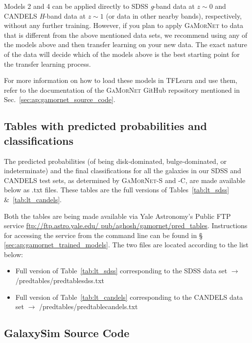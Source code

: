 \documentclass[twocolumn]{aastex63}
\newcommand\gamornet{G\textsc{a}M\textsc{or}N\textsc{et}}
\begin{document}
Models 2 and 4 can be applied directly to SDSS \textit{g}-band data at $z\sim0$ and CANDELS \textit{H}-band data at $z\sim1$ (or data in other nearby bands), respectively, without any further training. However, if you plan to apply \gamornet{} to data that is different from the above mentioned data sets, we recommend using any of the models above and then transfer learning on your new data. The exact nature of the data will decide which of the models above is the best starting point for the transfer learning process. 

For more information on how to load these models in TFLearn and use them, refer to the documentation of the \gamornet{} GitHub repository mentioned in Sec.~\ref{sec:ap:gamornet_source_code}.

\subsection{ Tables with predicted probabilities and classifications}\label{sec:ap:prob_tables}
                                                                          
The predicted probabilities (of being disk-dominated, bulge-dominated, or indeterminate) and the final classifications for all the galaxies in our SDSS and CANDELS test sets, as determined by \gamornet{}-S and -C, are made available below as .txt files. These tables are the full versions of Tables~\ref{tab:lt_sdss} \&~\ref{tab:lt_candels}.

Both the tables are being made available via Yale Astronomy's Public FTP service \href{ftp://ftp.astro.yale.edu/pub/aghosh/gamornet/pred_tables}{ftp://ftp.astro.yale.edu/ pub/aghosh/gamornet/pred\_tables}. Instructions for accessing the service from the command line can be found in \S\,\ref{sec:ap:gamornet_trained_models}. The two files are located according to the list below:

\begin{itemize}
    \item Full version of Table~\ref{tab:lt_sdss} corresponding to the SDSS data set $\xrightarrow{}$ /pred\textunderscore tables/pred\textunderscore table\textunderscore sdss.txt
    \item Full version of Table~\ref{tab:lt_candels} corresponding to the CANDELS data set $\xrightarrow{}$ /pred\textunderscore tables/pred\textunderscore table\textunderscore candels.txt
\end{itemize}

\subsection{ GalaxySim Source Code }\label{sec:ap:galsim}
\end{document}
